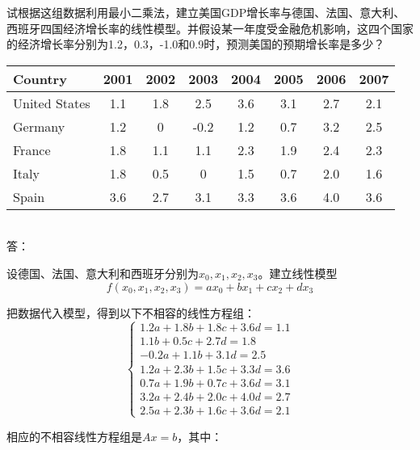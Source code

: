 \documentclass[a4paper, 12pt]{article}
\begin{document}
试根据这组数据利用最小二乘法，建立美国GDP增长率与德国、法国、意大利、西班牙四国经济增长率的线性模型。并假设某一年度受金融危机影响，这四个国家的经济增长率分别为1.2，0.3，-1.0和0.9时，预测美国的预期增长率是多少？
\\

\begin{tabular}{lccccccc}
\toprule
Country& 2001& 2002& 2003& 2004& 2005& 2006& 2007\\
\midrule
United States& 1.1& 1.8& 2.5& 3.6& 3.1& 2.7& 2.1\\
Germany& 1.2& 0& -0.2& 1.2& 0.7& 3.2& 2.5\\
France& 1.8& 1.1& 1.1& 2.3& 1.9& 2.4& 2.3\\
Italy& 1.8& 0.5& 0& 1.5& 0.7& 2.0& 1.6\\
Spain& 3.6& 2.7& 3.1& 3.3& 3.6& 4.0& 3.6\\
\bottomrule
\end{tabular}
\\

答：

设德国、法国、意大利和西班牙分别为\begin{math}x_{0}, x_{1}, x_{2}, x_{3}\end{math}。建立线性模型
\begin{displaymath}f(x_{0}, x_{1}, x_{2}, x_{3}) = ax_{0} + bx_{1} + cx_{2} + dx_{3}\end{displaymath}

把数据代入模型，得到以下不相容的线性方程组：
\[
\left\{                  %
\begin{array}{lll}     %
1.2a + 1.8b + 1.8c + 3.6d = 1.1\\
1.1b + 0.5c + 2.7d = 1.8\\
-0.2a + 1.1b + 3.1d = 2.5\\
1.2a + 2.3b + 1.5c + 3.3d = 3.6\\
0.7a + 1.9b + 0.7c + 3.6d = 3.1\\
3.2a + 2.4b + 2.0c + 4.0d = 2.7\\
2.5a + 2.3b + 1.6c + 3.6d = 2.1
\end{array}           %
\right.              %
\]

相应的不相容线性方程组是\begin{math}Ax = b\end{math}，其中：
\end{document}
